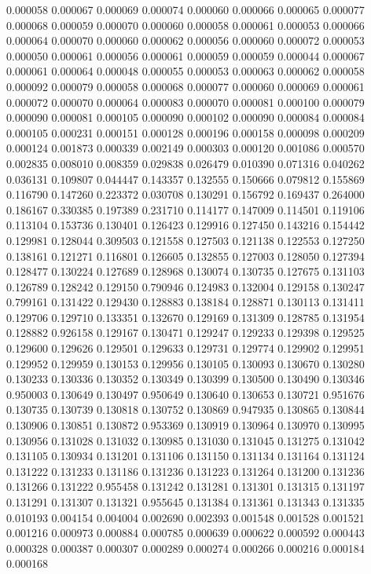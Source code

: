 0.000058
0.000067
0.000069
0.000074
0.000060
0.000066
0.000065
0.000077
0.000068
0.000059
0.000070
0.000060
0.000058
0.000061
0.000053
0.000066
0.000064
0.000070
0.000060
0.000062
0.000056
0.000060
0.000072
0.000053
0.000050
0.000061
0.000056
0.000061
0.000059
0.000059
0.000044
0.000067
0.000061
0.000064
0.000048
0.000055
0.000053
0.000063
0.000062
0.000058
0.000092
0.000079
0.000058
0.000068
0.000077
0.000060
0.000069
0.000061
0.000072
0.000070
0.000064
0.000083
0.000070
0.000081
0.000100
0.000079
0.000090
0.000081
0.000105
0.000090
0.000102
0.000090
0.000084
0.000084
0.000105
0.000231
0.000151
0.000128
0.000196
0.000158
0.000098
0.000209
0.000124
0.001873
0.000339
0.002149
0.000303
0.000120
0.001086
0.000570
0.002835
0.008010
0.008359
0.029838
0.026479
0.010390
0.071316
0.040262
0.036131
0.109807
0.044447
0.143357
0.132555
0.150666
0.079812
0.155869
0.116790
0.147260
0.223372
0.030708
0.130291
0.156792
0.169437
0.264000
0.186167
0.330385
0.197389
0.231710
0.114177
0.147009
0.114501
0.119106
0.113104
0.153736
0.130401
0.126423
0.129916
0.127450
0.143216
0.154442
0.129981
0.128044
0.309503
0.121558
0.127503
0.121138
0.122553
0.127250
0.138161
0.121271
0.116801
0.126605
0.132855
0.127003
0.128050
0.127394
0.128477
0.130224
0.127689
0.128968
0.130074
0.130735
0.127675
0.131103
0.126789
0.128242
0.129150
0.790946
0.124983
0.132004
0.129158
0.130247
0.799161
0.131422
0.129430
0.128883
0.138184
0.128871
0.130113
0.131411
0.129706
0.129710
0.133351
0.132670
0.129169
0.131309
0.128785
0.131954
0.128882
0.926158
0.129167
0.130471
0.129247
0.129233
0.129398
0.129525
0.129600
0.129626
0.129501
0.129633
0.129731
0.129774
0.129902
0.129951
0.129952
0.129959
0.130153
0.129956
0.130105
0.130093
0.130670
0.130280
0.130233
0.130336
0.130352
0.130349
0.130399
0.130500
0.130490
0.130346
0.950003
0.130649
0.130497
0.950649
0.130640
0.130653
0.130721
0.951676
0.130735
0.130739
0.130818
0.130752
0.130869
0.947935
0.130865
0.130844
0.130906
0.130851
0.130872
0.953369
0.130919
0.130964
0.130970
0.130995
0.130956
0.131028
0.131032
0.130985
0.131030
0.131045
0.131275
0.131042
0.131105
0.130934
0.131201
0.131106
0.131150
0.131134
0.131164
0.131124
0.131222
0.131233
0.131186
0.131236
0.131223
0.131264
0.131200
0.131236
0.131266
0.131222
0.955458
0.131242
0.131281
0.131301
0.131315
0.131197
0.131291
0.131307
0.131321
0.955645
0.131384
0.131361
0.131343
0.131335
0.010193
0.004154
0.004004
0.002690
0.002393
0.001548
0.001528
0.001521
0.001216
0.000973
0.000884
0.000785
0.000639
0.000622
0.000592
0.000443
0.000328
0.000387
0.000307
0.000289
0.000274
0.000266
0.000216
0.000184
0.000168
